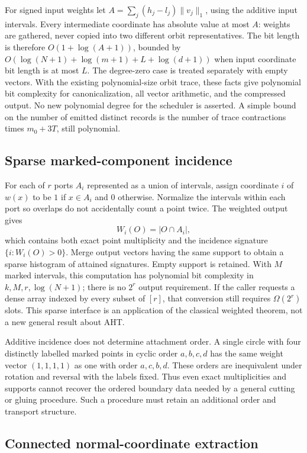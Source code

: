 For signed input weights let
$A=\sum_j (h_j-l_j)\|v_j\|_1$, using the additive input intervals.
Every intermediate coordinate has absolute value at most $A$: weights
are gathered, never copied into two different orbit representatives.
The bit length is therefore $O(1+\log(A+1))$, bounded by
$O(\log(N+1)+\log(m+1)+L+\log(d+1))$ when input coordinate bit length
is at most $L$. The degree-zero case is treated separately with empty
vectors. With the existing polynomial-size orbit trace, these facts give
polynomial bit complexity for canonicalization, all vector arithmetic,
and the compressed output. No new polynomial degree for the scheduler is
asserted. A simple bound on the number of emitted distinct records is the
number of trace contractions times $m_0+3T$, still polynomial.

\subsection{Sparse marked-component incidence}

For each of $r$ ports $A_i$ represented as a union of intervals, assign
coordinate $i$ of $w(x)$ to be $1$ if $x\in A_i$ and $0$ otherwise.
Normalize the intervals within each port so overlaps do not accidentally
count a point twice. The weighted output gives
\[
        W_i(O)=|O\cap A_i|,
\]
which contains both exact point multiplicity and the incidence signature
$\{i:W_i(O)>0\}$. Merge output vectors having the same support to obtain
a sparse histogram of attained signatures. Empty support is retained.
With $M$ marked intervals, this computation has polynomial bit complexity
in $k,M,r,\log(N+1)$; there is no $2^r$ output requirement. If the caller
requests a dense array indexed by every subset of $[r]$, that conversion
still requires $\Omega(2^r)$ slots. This sparse interface is an application
of the classical weighted theorem, not a new general result about AHT.

Additive incidence does not determine attachment order. A single circle
with four distinctly labelled marked points in cyclic order $a,b,c,d$
has the same weight vector $(1,1,1,1)$ as one with order $a,c,b,d$.
These orders are inequivalent under rotation and reversal with the labels
fixed. Thus even exact multiplicities and supports cannot recover the
ordered boundary data needed by a general cutting or gluing procedure.
Such a procedure must retain an additional order and transport structure.

\subsection{Connected normal-coordinate extraction}

